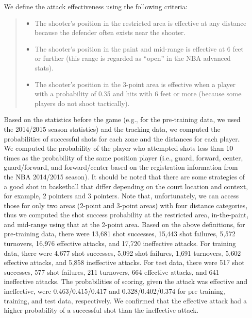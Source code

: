 \documentclass[journal]{IEEEtran}
\begin{document}
We define the attack effectiveness using the following criteria:
\vspace{-0pt}
\begin{quote}
\begin{itemize}
\item The shooter's position in the restricted area is effective at any distance because the defender often exists near the shooter.
\item The shooter's position in the paint and mid-range is effective at 6 feet or further (this range is regarded as ``open'' in the NBA advanced stats).
\item The shooter's position in the 3-point area is effective when a player with a probability of 0.35 and hits with 6 feet or more (because some players do not shoot tactically).
\end{itemize}
\end{quote}
\vspace{-0pt}
Based on the statistics before the game (e.g., for the pre-training data, we used the 2014/2015 season statistics) and the tracking data, 
we computed the probabilities of successful shots for each zone and the distances for each player. 
We computed the probability of the player who attempted shots less than 10 times as the probability of the same position player (i.e., guard, forward, center, guard/forward, and forward/center based on the registration information from the NBA 2014/2015 season).
It should be noted that there are some strategies of a good shot in basketball that differ depending on the court location and context, for example, 2 pointers and 3 pointers.
Note that, unfortunately, we can access those for only two areas (2-point and 3-point areas) with four distance categories, thus we computed the shot success probability at the restricted area, in-the-paint, and mid-range using that at the 2-point area.
%
Based on the above definitions, for pre-training data, there were 13,681 shot successes, 15,443 shot failures, 5,572 turnovers,
16,976 effective attacks, and 17,720 ineffective attacks.
For training data, there were 4,677 shot successes, 5,092 shot failures, 1,691 turnovers, 5,602 effective attacks, and 5,858 ineffective attacks.
For test data, there were 517 shot successes, 577 shot failures, 211 turnovers, 664 effective attacks, and 641 ineffective attacks.
The probabilities of scoring, given the attack was effective and ineffective, were 0.463/0.415/0.417 and 0.328/0.402/0.374 for pre-training, training, and test data, respectively.
We confirmed that the effective attack had a higher probability of a successful shot than the ineffective attack. 
\end{document}
